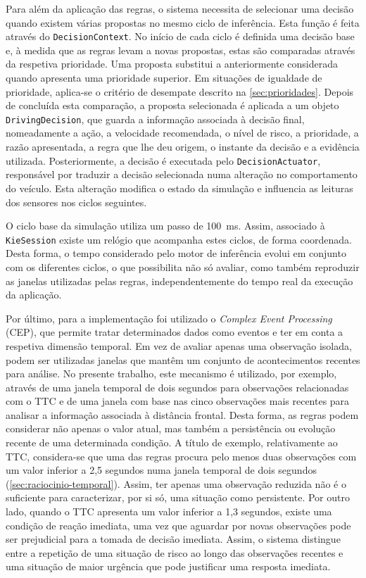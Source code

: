 Para além da aplicação das regras, o sistema necessita de selecionar uma
decisão quando existem várias propostas no mesmo ciclo de inferência. Esta
função é feita através do \texttt{DecisionContext}. No início de cada ciclo é
definida uma decisão base e, à medida que as regras levam a novas propostas,
estas são comparadas através da respetiva prioridade. Uma proposta substitui a
anteriormente considerada quando apresenta uma prioridade superior. Em
situações de igualdade de prioridade, aplica-se o critério de desempate
descrito na \cref{sec:prioridades}. Depois de concluída esta comparação, a proposta selecionada é aplicada a um
objeto \texttt{DrivingDecision}, que guarda a informação associada à decisão
final, nomeadamente a ação, a velocidade recomendada, o nível de risco, a
prioridade, a razão apresentada, a regra que lhe deu origem, o instante da
decisão e a evidência utilizada. Posteriormente, a decisão é executada pelo
\texttt{DecisionActuator}, responsável por traduzir a decisão selecionada numa
alteração no comportamento do veículo. Esta alteração modifica o estado da
simulação e influencia as leituras dos sensores nos ciclos seguintes.

O ciclo base da simulação utiliza um passo de 100~ms. Assim, associado à
\texttt{KieSession} existe um relógio que acompanha estes ciclos, de forma
coordenada. Desta forma, o tempo considerado pelo motor de inferência evolui
em conjunto com os diferentes ciclos, o que possibilita não só avaliar, como
também reproduzir as janelas utilizadas pelas regras, independentemente do
tempo real da execução da aplicação.

Por último, para a implementação foi utilizado o \emph{Complex Event
Processing} (CEP), que permite tratar determinados dados como eventos e ter em
conta a respetiva dimensão temporal. Em vez de avaliar apenas uma observação
isolada, podem ser utilizadas janelas que mantêm um conjunto de
acontecimentos recentes para análise. No presente trabalho, este mecanismo é
utilizado, por exemplo, através de uma janela temporal de dois segundos para
observações relacionadas com o TTC e de uma janela com base nas cinco
observações mais recentes para analisar a informação associada à distância
frontal. Desta forma, as regras podem considerar não apenas o valor atual, mas
também a persistência ou evolução recente de uma determinada condição. A
título de exemplo, relativamente ao TTC, considera-se que uma das regras
procura pelo menos duas observações com um valor inferior a 2,5 segundos numa
janela temporal de dois segundos (\cref{sec:raciocinio-temporal}). Assim, ter apenas uma observação reduzida
não é o suficiente para caracterizar, por si só, uma situação como
persistente. Por outro lado, quando o TTC apresenta um valor inferior a 1,3
segundos, existe uma condição de reação imediata, uma vez que aguardar por
novas observações pode ser prejudicial para a tomada de decisão imediata.
Assim, o sistema distingue entre a repetição de uma situação de risco ao longo
das observações recentes e uma situação de maior urgência que pode justificar
uma resposta imediata.

